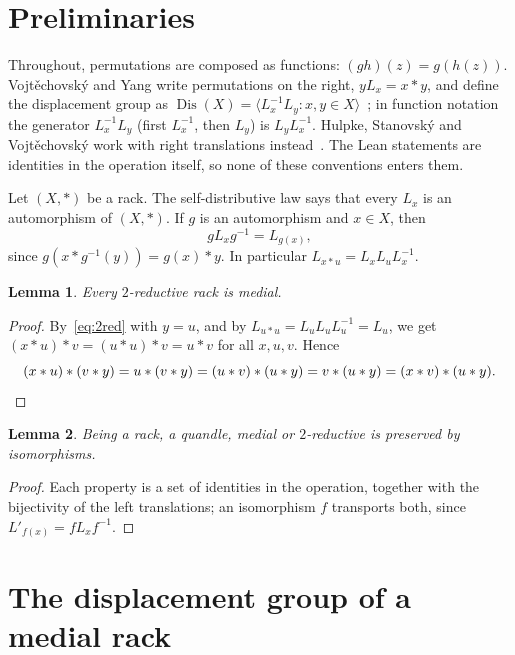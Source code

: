 \documentclass[11pt]{article}
\newtheorem{lemma}{Lemma}
\theoremstyle{definition}
\theoremstyle{remark}
\DeclareMathOperator{\Dis}{Dis}
\begin{document}
\section{Preliminaries}\label{sec:prelim}

Throughout, permutations are composed as functions: $(gh)(z)=g(h(z))$.
Vojt\v{e}chovsk\'y and Yang write permutations on the right,
$yL_x=x*y$, and define the displacement group as
$\Dis(X)=\langle L_x^{-1}L_y : x,y\in X\rangle$~\cite[Section~1.1]{vy}; in
function notation the generator $L_x^{-1}L_y$ (first $L_x^{-1}$, then $L_y$) is
$L_yL_x^{-1}$. Hulpke, Stanovsk\'y and Vojt\v{e}chovsk\'y work with right
translations instead~\cite{hsv}. The Lean statements are identities in the
operation itself, so none of these conventions enters them.

Let $(X,*)$ be a rack. The self-distributive law says that every $L_x$ is an
automorphism of $(X,*)$. If $g$ is an automorphism and $x\in X$, then
\begin{equation}\label{eq:conj}
gL_xg^{-1}=L_{g(x)},
\end{equation}
since $g(x*g^{-1}(y))=g(x)*y$. In particular $L_{x*u}=L_xL_uL_x^{-1}$.

\begin{lemma}\label{lem:redmed}
Every $2$-reductive rack is medial.
\end{lemma}

\begin{proof}
By~\eqref{eq:2red} with $y=u$, and by $L_{u*u}=L_uL_uL_u^{-1}=L_u$, we get
$(x*u)*v=(u*u)*v=u*v$ for all $x,u,v$. Hence
\[
(x*u)*(v*y)=u*(v*y)=(u*v)*(u*y)=v*(u*y)=(x*v)*(u*y).\qedhere
\]
\end{proof}

\begin{lemma}\label{lem:inv}
Being a rack, a quandle, medial or $2$-reductive is preserved by isomorphisms.
\end{lemma}

\begin{proof}
Each property is a set of identities in the operation, together with the
bijectivity of the left translations; an isomorphism $f$ transports both,
since $L'_{f(x)}=fL_xf^{-1}$.
\end{proof}

\section{The displacement group of a medial rack}\label{sec:dis}
\end{document}

